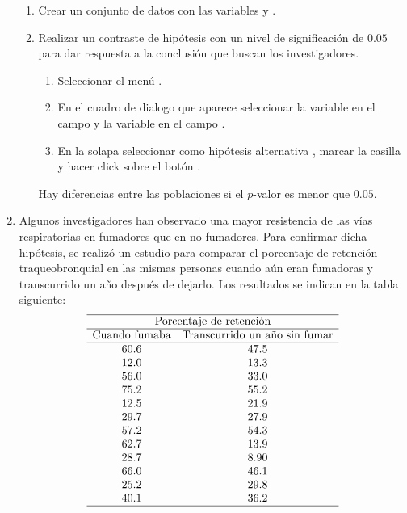 \begin{enumerate}[leftmargin=*]
\begin{enumerate}
\item Crear un conjunto de datos con las variables  y .

\item Realizar un contraste de hipótesis con un nivel de significación de $0.05$ para dar respuesta a la conclusión que
buscan los investigadores.
\begin{indicacion}
\begin{enumerate}
\item Seleccionar el menú .
\item En el cuadro de dialogo que aparece seleccionar la variable  en el campo  y la
variable  en el campo .
\item En la solapa  seleccionar como hipótesis alternativa ,
marcar la casilla  y hacer click sobre el botón .
\end{enumerate}
Hay diferencias entre las poblaciones si el $p$-valor es menor que $0.05$.
\end{indicacion}
\end{enumerate}


\item Algunos investigadores han observado una mayor resistencia de las vías respiratorias en fumadores que en no
fumadores.
Para confirmar dicha hipótesis, se realizó un estudio para comparar el porcentaje de retención traqueobronquial en las
mismas personas cuando aún eran fumadoras y transcurrido un año después de dejarlo.
Los resultados se indican en la tabla siguiente:
\[
\begin{array}{cc}
\hline
\multicolumn{2}{c}{\text{Porcentaje de retención}} \\
\hline
\text{Cuando fumaba} & \text{Transcurrido un año sin fumar} \\
\hline
60.6 & 47.5 \\
12.0 & 13.3 \\
56.0 & 33.0 \\
75.2 & 55.2 \\
12.5 & 21.9 \\
29.7 & 27.9 \\
57.2 & 54.3 \\
62.7 & 13.9 \\
28.7 & 8.90 \\
66.0 & 46.1 \\
25.2 & 29.8 \\
40.1 & 36.2 \\
\hline
\end{array}
\]


\end{enumerate}
